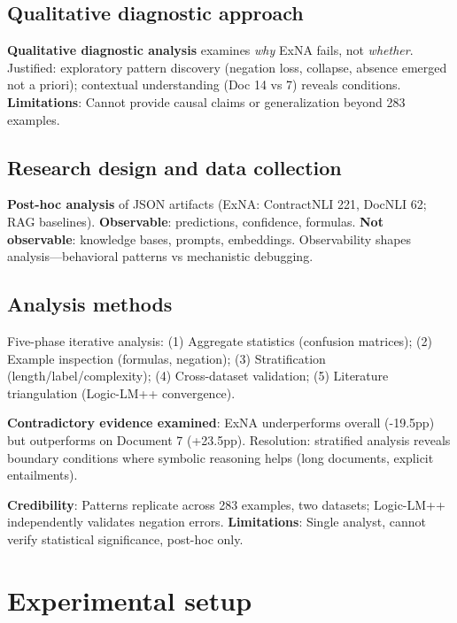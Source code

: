 \documentclass[12pt,a4paper]{article}
\begin{document}
\subsection{Qualitative diagnostic approach}

\textbf{Qualitative diagnostic analysis} examines \textit{why} ExNA fails, not \textit{whether}. Justified: exploratory pattern discovery (negation loss, collapse, absence emerged not a priori); contextual understanding (Doc 14 vs 7) reveals conditions. \textbf{Limitations}: Cannot provide causal claims or generalization beyond 283 examples.

\subsection{Research design and data collection}

\textbf{Post-hoc analysis} of JSON artifacts (ExNA: ContractNLI 221, DocNLI 62; RAG baselines). \textbf{Observable}: predictions, confidence, formulas. \textbf{Not observable}: knowledge bases, prompts, embeddings. Observability shapes analysis—behavioral patterns vs mechanistic debugging.

\subsection{Analysis methods}

Five-phase iterative analysis: (1) Aggregate statistics (confusion matrices); (2) Example inspection (formulas, negation); (3) Stratification (length/label/complexity); (4) Cross-dataset validation; (5) Literature triangulation (Logic-LM++ convergence).

\textbf{Contradictory evidence examined}: ExNA underperforms overall (-19.5pp) but outperforms on Document 7 (+23.5pp). Resolution: stratified analysis reveals boundary conditions where symbolic reasoning helps (long documents, explicit entailments).

\textbf{Credibility}: Patterns replicate across 283 examples, two datasets; Logic-LM++ independently validates negation errors. \textbf{Limitations}: Single analyst, cannot verify statistical significance, post-hoc only.

\section{Experimental setup}
\end{document}
